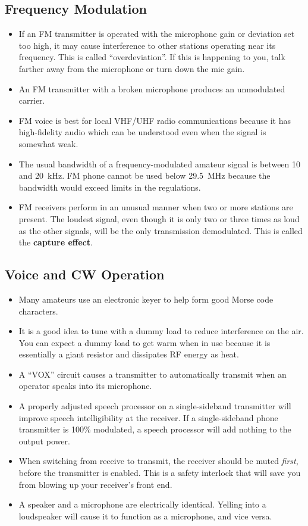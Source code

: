 \documentclass[letterpaper,12pt]{scrartcl}
\begin{document}
\subsection{Frequency Modulation}

\begin{itemize}
\item If an FM transmitter is operated with the microphone gain or deviation set too high, it may cause interference to other stations
operating near its frequency. This is called ``overdeviation''. If this is happening to you, talk farther away from the microphone or turn down the mic gain.
\item An FM transmitter with a broken microphone produces an unmodulated carrier.
\item FM voice is best for local VHF/UHF radio communications because it has high-fidelity audio which can be understood even when the signal is somewhat weak.
\item The usual bandwidth of a frequency-modulated amateur signal is between 10 and 20~kHz.
FM phone cannot be used below 29.5~MHz because the bandwidth would exceed limits in the regulations.
\item FM receivers perform in an unusual manner when two or more stations are present. The loudest signal, even though it is only two or three times 
as loud as the other signals, will be the only transmission demodulated. This is called the \textbf{capture effect}.
\end{itemize}

\subsection{Voice and CW Operation}

\begin{itemize}
\item Many amateurs use an electronic keyer to help form good Morse code characters.
\item It is a good idea to tune with a dummy load to reduce interference on the air. You can expect a dummy load to get warm when in use because
it is essentially a giant resistor and dissipates RF energy as heat.
\item A ``VOX'' circuit causes a transmitter to automatically transmit when an operator speaks into its microphone.
\item A properly adjusted speech processor on a single-sideband transmitter will improve speech intelligibility at the receiver.
If a single-sideband phone transmitter is 100\% modulated, a speech processor will add nothing to the output power.
\item When switching from receive to transmit, the receiver should be muted \textit{first}, before the transmitter is enabled.
This is a safety interlock that will save you from blowing up your receiver's front end.
\item A speaker and a microphone are electrically identical. Yelling into a loudspeaker will cause it to function as a microphone, and vice versa.
\end{itemize}
\end{document}
